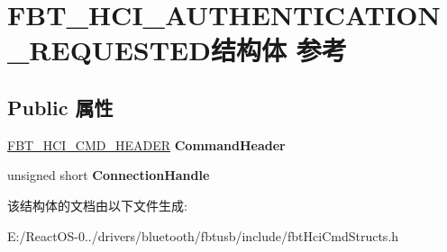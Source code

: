 \hypertarget{struct_f_b_t___h_c_i___a_u_t_h_e_n_t_i_c_a_t_i_o_n___r_e_q_u_e_s_t_e_d}{}\section{F\+B\+T\+\_\+\+H\+C\+I\+\_\+\+A\+U\+T\+H\+E\+N\+T\+I\+C\+A\+T\+I\+O\+N\+\_\+\+R\+E\+Q\+U\+E\+S\+T\+E\+D结构体 参考}
\label{struct_f_b_t___h_c_i___a_u_t_h_e_n_t_i_c_a_t_i_o_n___r_e_q_u_e_s_t_e_d}
\subsection*{Public 属性}
\begin{DoxyCompactItemize}
\item 
\mbox{\label{struct_f_b_t___h_c_i___a_u_t_h_e_n_t_i_c_a_t_i_o_n___r_e_q_u_e_s_t_e_d_afd57ecbf93f72be18fb9af38eb096afb}} 
\hyperlink{struct_f_b_t___h_c_i___c_m_d___h_e_a_d_e_r}{F\+B\+T\+\_\+\+H\+C\+I\+\_\+\+C\+M\+D\+\_\+\+H\+E\+A\+D\+ER} {\bfseries Command\+Header}
\item 
\mbox{\label{struct_f_b_t___h_c_i___a_u_t_h_e_n_t_i_c_a_t_i_o_n___r_e_q_u_e_s_t_e_d_a0edd6dcc95e90b9172293e5e0d06c5f7}} 
unsigned short {\bfseries Connection\+Handle}
\end{DoxyCompactItemize}


该结构体的文档由以下文件生成\+:\begin{DoxyCompactItemize}
\item 
E\+:/\+React\+O\+S-\/0../drivers/bluetooth/fbtusb/include/fbt\+Hci\+Cmd\+Structs.\+h\end{DoxyCompactItemize}

